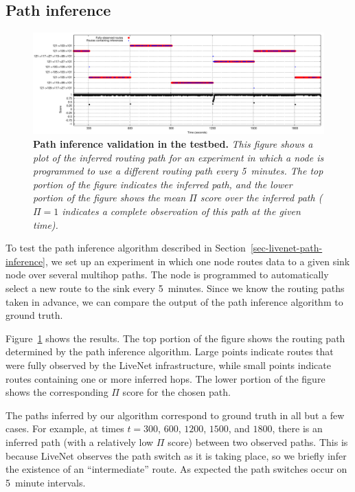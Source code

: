 \subsection{Path inference}

\begin{figure}[t]
\begin{center}
\includegraphics[width=0.9\hsize]{./resources/livenet-sensys07/figs/pathinference/motelab/path-motelab.pdf}
\end{center}
\caption{\small {\bf Path inference validation in the testbed.}
{\em This figure shows a plot of the inferred routing path for an
experiment in which a node is programmed to use a different routing
path every 5~minutes.
The top portion of the figure indicates the inferred path, and the
lower portion of the figure shows the mean $\Pi$ score over the
inferred path ($\Pi = 1$ indicates a complete observation of this path
at the given time).}}
\label{fig-path-validation}
\end{figure}

To test the path inference algorithm described in
Section~\ref{sec-livenet-path-inference}, we set up an experiment in which 
one node routes data to a given sink node over several multihop paths.
The node is programmed to automatically select a new route to the sink
every 5~minutes. Since we know the routing paths taken in advance, we
can compare the output of the path inference algorithm to ground
truth.

Figure~\ref{fig-path-validation} shows the results. The top portion
of the figure shows the routing path determined by the path inference
algorithm. Large points indicate routes that were fully observed by
the LiveNet infrastructure, while small points indicate routes
containing one or more inferred hops. The lower portion of the
figure shows the corresponding $\Pi$ score for the chosen path.

The paths inferred by our algorithm correspond to ground truth
in all but a few cases. For example, at times $t=300$, $600$, $1200$,
$1500$, and $1800$, there is an inferred path (with a relatively 
low $\Pi$ score) between two observed paths. This is because LiveNet
observes the path switch as it is taking place, so we briefly infer the
existence of an ``intermediate'' route. As expected the path switches
occur on 5~minute intervals.




